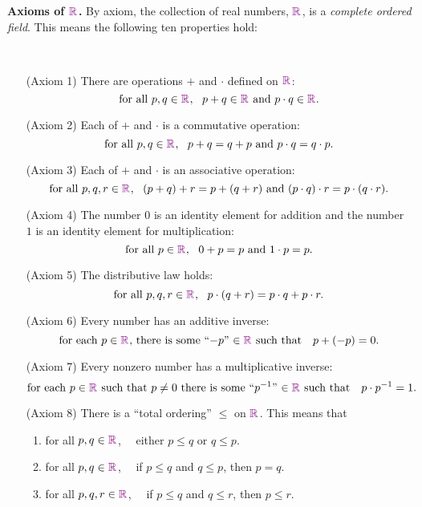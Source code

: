 \documentclass[12pt]{amsart}
\newcommand{\R}{ {\color{violet} \mathbb{R}\hspace{.2mm} }}
\begin{document}
\newpage


\noindent \textbf{Axioms of $\R$.} By axiom, the collection of real numbers, $\R$, is a \emph{complete ordered field}. This means the following ten properties hold:

\


\begin{enumerate}
\item[(Axiom 1)] There are operations $+$ and $\cdot$ defined on $\R$:
\[\text{for all $p, q\in \R$}, \ \ p + q\in \R \ \text{and} \ p \cdot q\in \R.\]



\item[(Axiom 2)] Each of $+$ and $\cdot$ is a commutative operation:
\[\text{for all $p,q\in \R$}, \ \ p + q = q + p \ \text{and} \ p \cdot q = q \cdot p.\]



\item[(Axiom 3)]  Each of $+$ and $\cdot$ is an associative  operation:
\[\text{for all $p,q,r\in \R$}, \ \  (p + q) + r = p + (q + r)\  \text{and}\   (p \cdot q) \cdot r = p \cdot (q \cdot r).\] 



\item[(Axiom 4)]  The number $0$ is an identity element for addition and the number $1$ is an identity element for multiplication:
 \[\text{for all $p \in \R$}, \ \ 0 + p=p \ \text{and} \ 1 \cdot p = p .\]
 
\item[(Axiom 5)]  The distributive law holds: 
\[\text{for all $p,q,r\in \R$}, \ \  p \cdot (q + r) = p \cdot q + p \cdot r.\] 

\item[(Axiom 6)]  Every number has an additive inverse:
\[\text{for each $p \in \R$, there is some ``$-p$'' $\in \R$ such that }\ \ p + (-p)=0 .\]


\item[(Axiom 7)] Every nonzero number has a multiplicative inverse: 
\[\text{for each $p \in \R$ such that $p\neq 0$ there is some ``$p^{-1}$'' $\in \R$ such that } \ \ p \cdot p^{-1}=1 .\]

\item[(Axiom 8)]  There is a ``total ordering'' $\leq$ on $\R$. This means that 
\begin{enumerate}
\item for all $p,q\in \R$, \ \ either $p \leq q$ or $q \leq p$.
\item for all $p,q\in \R$, \  \ if $p \leq q$ and $q \leq p$, then $p = q$.
\item for all $p,q,r\in \R$, \ \ if $p \leq q$ and $q \leq r$, then $p \leq r$.
\end{enumerate}


\end{enumerate}
\end{document}
